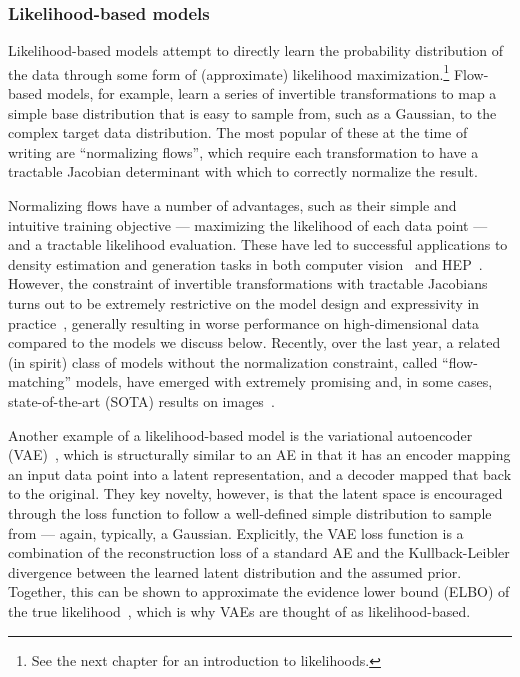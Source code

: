 \subsubsection{Likelihood-based models}

Likelihood-based models attempt to directly learn the probability distribution of the data through some form of (approximate) likelihood maximization.\footnote{See the next chapter for an introduction to likelihoods.}
Flow-based models, for example, learn a series of invertible transformations to map a simple base distribution that is easy to sample from, such as a Gaussian, to the complex target data distribution.
The most popular of these at the time of writing are ``normalizing flows'', which require each transformation to have a tractable Jacobian determinant with which to correctly normalize the result.

Normalizing flows have a number of advantages, such as their simple and intuitive training objective --- maximizing the likelihood of each data point --- and a tractable likelihood evaluation.
These have led to successful applications to density estimation and generation tasks in both computer vision~\cite{dinh2017density, kingma2018glow} and HEP~\cite{Krause:2021ilc}.
However, the constraint of invertible transformations with tractable Jacobians turns out to be extremely restrictive on the model design and expressivity in practice~\cite{fjelde2024flow, hawley2024flow}, generally resulting in worse performance on high-dimensional data compared to the models we discuss below.
Recently, over the last year, a related (in spirit) class of models without the normalization constraint, called ``flow-matching'' models, have emerged with extremely promising and, in some cases, state-of-the-art (SOTA) results on images~\cite{liu2023flow, lee2024improving}.

Another example of a likelihood-based model is the variational autoencoder (VAE)~\cite{VAE}, which is structurally similar to an AE in that it has an encoder mapping an input data point into a latent representation, and a decoder mapped that back to the original.
They key novelty, however, is that the latent space is encouraged through the loss function to follow a well-defined simple distribution to sample from --- again, typically, a Gaussian.
Explicitly, the VAE loss function is a combination of the reconstruction loss of a standard AE and the Kullback-Leibler divergence between the learned latent distribution and the assumed prior.
Together, this can be shown to approximate the evidence lower bound (ELBO) of the true likelihood~\cite{VAE}, which is why VAEs are thought of as likelihood-based.

